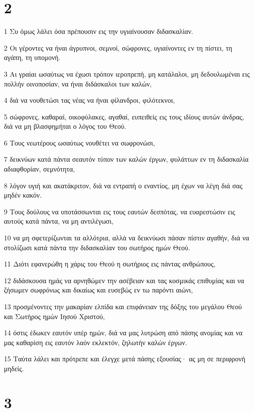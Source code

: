 \chapter{2}

\par 1 Συ όμως λάλει όσα πρέπουσιν εις την υγιαίνουσαν διδασκαλίαν.
\par 2 Οι γέροντες να ήναι άγρυπνοι, σεμνοί, σώφρονες, υγιαίνοντες εν τη πίστει, τη αγάπη, τη υπομονή.
\par 3 Αι γραίαι ωσαύτως να έχωσι τρόπον ιεροπρεπή, μη κατάλαλοι, μη δεδουλωμέναι εις πολλήν οινοποσίαν, να ήναι διδάσκαλοι των καλών,
\par 4 διά να νουθετώσι τας νέας να ήναι φίλανδροι, φιλότεκνοι,
\par 5 σώφρονες, καθαραί, οικοφύλακες, αγαθαί, ευπειθείς εις τους ιδίους αυτών άνδρας, διά να μη βλασφημήται ο λόγος του Θεού.
\par 6 Τους νεωτέρους ωσαύτως νουθέτει να σωφρονώσι,
\par 7 δεικνύων κατά πάντα σεαυτόν τύπον των καλών έργων, φυλάττων εν τη διδασκαλία αδιαφθορίαν, σεμνότητα,
\par 8 λόγον υγιή και ακατάκριτον, διά να εντραπή ο εναντίος, μη έχων να λέγη διά σας μηδέν κακόν.
\par 9 Τους δούλους να υποτάσσωνται εις τους εαυτών δεσπότας, να ευαρεστώσιν εις αυτούς κατά πάντα, να μη αντιλέγωσι,
\par 10 να μη σφετερίζωνται τα αλλότρια, αλλά να δεικνύωσι πάσαν πίστιν αγαθήν, διά να στολίζωσι κατά πάντα την διδασκαλίαν του σωτήρος ημών Θεού.
\par 11 Διότι εφανερώθη η χάρις του Θεού η σωτήριος εις πάντας ανθρώπους,
\par 12 διδάσκουσα ημάς να αρνηθώμεν την ασέβειαν και τας κοσμικάς επιθυμίας και να ζήσωμεν σωφρόνως και δικαίως και ευσεβώς εν τω παρόντι αιώνι,
\par 13 προσμένοντες την μακαρίαν ελπίδα και επιφάνειαν της δόξης του μεγάλου Θεού και Σωτήρος ημών Ιησού Χριστού,
\par 14 όστις έδωκεν εαυτόν υπέρ ημών, διά να μας λυτρώση από πάσης ανομίας και να μας καθαρίση εις εαυτόν λαόν εκλεκτόν, ζηλωτήν καλών έργων.
\par 15 Ταύτα λάλει και πρότρεπε και έλεγχε μετά πάσης εξουσίας· ας μη σε περιφρονή μηδείς.

\chapter{3}

